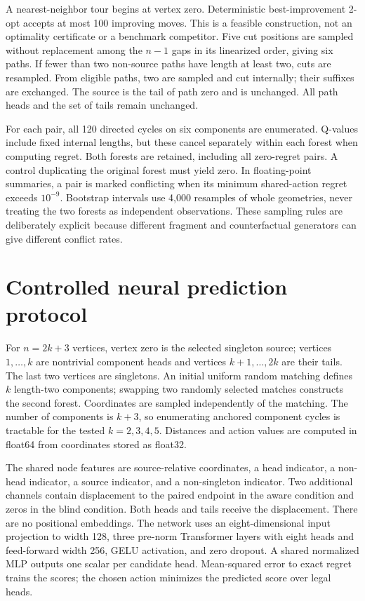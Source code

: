 A nearest-neighbor tour begins at vertex zero. Deterministic best-improvement
2-opt accepts at most 100 improving moves. This is a feasible construction,
not an optimality certificate or a benchmark competitor. Five cut positions
are sampled without replacement among the $n-1$ gaps in its linearized order,
giving six paths. If fewer than two non-source paths have length at least two,
cuts are resampled. From eligible paths, two are sampled and cut internally;
their suffixes are exchanged. The source is the tail of path zero and is
unchanged. All path heads and the set of tails remain unchanged.

For each pair, all 120 directed cycles on six components are enumerated.
Q-values include fixed internal lengths, but these cancel separately within
each forest when computing regret. Both forests are retained, including all
zero-regret pairs. A control duplicating the original forest must yield zero.
In floating-point summaries, a pair is marked conflicting when its minimum
shared-action regret exceeds $10^{-9}$.
Bootstrap intervals use 4,000 resamples of whole geometries, never treating
the two forests as independent observations. These sampling rules are
deliberately explicit because different fragment and counterfactual generators
can give different conflict rates.

\section{Controlled neural prediction protocol}
For $n=2k+3$ vertices, vertex zero is the selected singleton source;
vertices $1,\ldots,k$ are nontrivial component heads and vertices
$k+1,\ldots,2k$ are their tails. The last two vertices are singletons.
An initial uniform random matching defines $k$ length-two components;
swapping two randomly selected matches constructs the second forest.
Coordinates are sampled independently of the matching. The number of
components is $k+3$, so enumerating anchored component cycles is tractable
for the tested $k=2,3,4,5$. Distances and action values are computed in
float64 from coordinates stored as float32.

The shared node features are source-relative coordinates, a head indicator,
a non-head indicator, a source indicator, and a non-singleton indicator.
Two additional channels contain displacement to the paired endpoint in the
aware condition and zeros in the blind condition. Both heads and tails
receive the displacement. There are no positional embeddings. The network
uses an eight-dimensional input projection to width 128, three pre-norm
Transformer layers with eight heads and feed-forward width 256, GELU
activation, and zero dropout. A shared normalized MLP outputs one scalar
per candidate head. Mean-squared error to exact regret trains the scores;
the chosen action minimizes the predicted score over legal heads.


